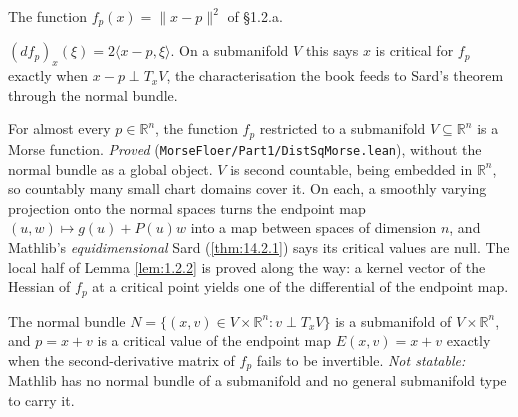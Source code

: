 \begin{definition}
  \label{def:distSq}
  \leanok
  The function $f_p(x) = \lVert x - p\rVert^2$ of \S1.2.a.
\end{definition}

\begin{proposition}
  \label{prop:fderiv_distSq}
  \leanok
  $(df_p)_x(\xi) = 2\langle x-p, \xi\rangle$.  On a submanifold $V$ this says $x$
  is critical for $f_p$ exactly when $x-p \perp T_xV$, the characterisation the
  book feeds to Sard's theorem through the normal bundle.
\end{proposition}

\begin{proposition}[Proposition 1.2.1]
  \label{prop:1.2.1}
  \leanok
  For almost every $p \in \mathbb{R}^n$, the function $f_p$ restricted to a
  submanifold $V \subseteq \mathbb{R}^n$ is a Morse function.
  \emph{Proved} (\texttt{MorseFloer/Part1/DistSqMorse.lean}), without the normal
  bundle as a global object.  $V$ is second countable, being embedded in
  $\mathbb{R}^n$, so countably many small chart domains cover it.  On each, a
  smoothly varying projection onto the normal spaces turns the endpoint map
  $(u,w) \mapsto g(u) + P(u)w$ into a map between spaces of dimension $n$, and
  Mathlib's \emph{equidimensional} Sard (\ref{thm:14.2.1}) says its critical
  values are null.  The local half of Lemma \ref{lem:1.2.2} is proved along the
  way: a kernel vector of the Hessian of $f_p$ at a critical point yields one of
  the differential of the endpoint map.
\end{proposition}

\begin{lemma}[Lemma 1.2.2]
  \label{lem:1.2.2}
  \notready
  The normal bundle $N = \{(x,v) \in V\times\mathbb{R}^n : v \perp T_xV\}$ is a
  submanifold of $V\times\mathbb{R}^n$, and $p = x+v$ is a critical value of the
  endpoint map $E(x,v) = x+v$ exactly when the second-derivative matrix of $f_p$
  fails to be invertible.
  \emph{Not statable:} Mathlib has no normal bundle of a submanifold and no
  general submanifold type to carry it.
\end{lemma}


